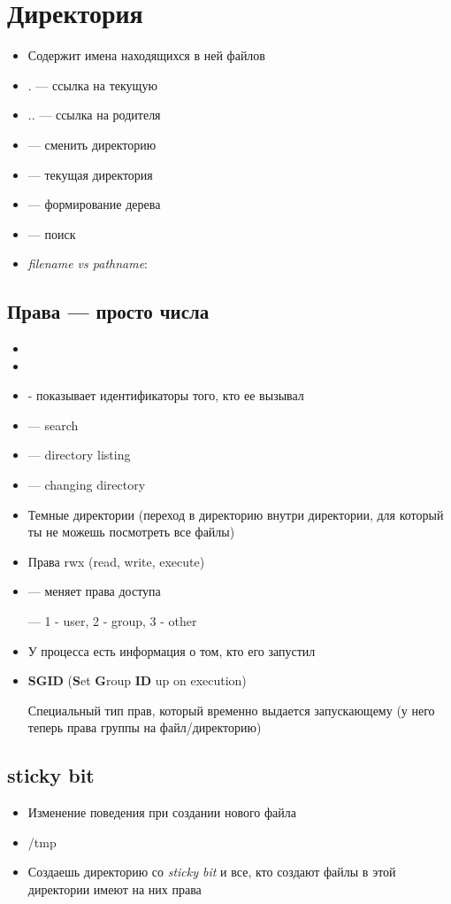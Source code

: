 \documentclass[../../lectures.tex]{subfiles}
\begin{document}
\section{Директория}
\begin{itemize}
    \item Содержит имена находящихся в ней файлов
    \item $.$ --- ссылка на текущую
    \item $..$ --- ссылка на родителя
    \item {} --- сменить директорию
    \item {} --- текущая директория
    \item {} --- формирование дерева
    \item {} --- поиск
    \item \emph{filename vs pathname}: 
\end{itemize}
\subsection{Права --- просто числа}
\begin{itemize}
    \item {}
    \item {}
    \item {} - показывает идентификаторы того, кто ее вызывал
    \item {} --- search
    \item {} --- directory listing
    \item {} --- changing directory
    \item Темные директории (переход в директорию внутри директории, для который ты не можешь посмотреть все файлы)
    \item Права rwx (read, write, execute)
    \item {} --- меняет права доступа
          
           --- 1 - user, 2 - group, 3 - other
    \item У процесса есть информация о том, кто его запустил
    \item \textbf{SGID} (\textbf{S}et \textbf{G}roup \textbf{ID} up on execution)

          Специальный тип прав, который временно выдается запускающему (у него теперь права группы на файл/директорию)
\end{itemize}
\subsection{sticky bit}
\begin{itemize}
    \item Изменение поведения при создании нового файла
    \item /tmp
    \item Создаешь директорию со \emph{sticky bit} и все, кто создают файлы в этой директории имеют на них права
\end{itemize}
\end{document}
